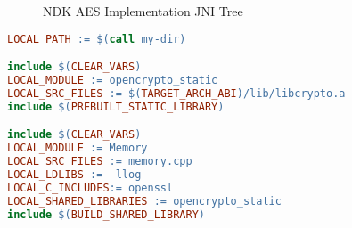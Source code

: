\begin{appendices}
\begin{figure}[htb]
\caption[NDK AES Implementation JNI Tree]{NDK AES Implementation JNI Tree}
\label{fig:ndk_aes_impl_tree}
\end{figure}
\newpage
\begin{lstlisting}[language=make, caption=Memory/Android.mk, label=nkd_aes_make]
LOCAL_PATH := $(call my-dir)

include $(CLEAR_VARS)
LOCAL_MODULE := opencrypto_static
LOCAL_SRC_FILES := $(TARGET_ARCH_ABI)/lib/libcrypto.a
include $(PREBUILT_STATIC_LIBRARY)

include $(CLEAR_VARS)
LOCAL_MODULE := Memory
LOCAL_SRC_FILES := memory.cpp
LOCAL_LDLIBS := -llog
LOCAL_C_INCLUDES:= openssl
LOCAL_SHARED_LIBRARIES := opencrypto_static
include $(BUILD_SHARED_LIBRARY)
\end{lstlisting}


\end{appendices}
